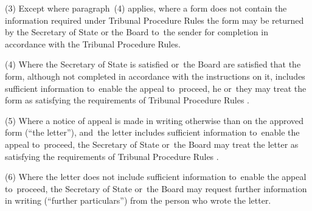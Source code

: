 \documentclass[12pt,a4paper]{article}
\begin{document}
%

(3) Except where paragraph~(4) applies, where a form does not contain the information required under Tribunal Procedure Rules the form may be returned by the Secretary of State
or the Board to~the sender for completion in accordance with the Tribunal Procedure Rules.

(4) Where the Secretary of State is satisfied 
or~the Board are satisfied   %
that the form, although not completed in accordance with the instructions on it, includes sufficient information to~enable the appeal 
to~proceed, he 
or~they   %
may treat the form as satisfying the requirements of 
Tribunal Procedure Rules%
.

(5) Where 
a notice of appeal  %
is made in writing otherwise than on the approved form (“the letter”), and~the letter includes sufficient information to~enable the appeal 
to~proceed, the Secretary of State 
or~the Board   %
may treat the letter as satisfying the requirements of 
Tribunal Procedure Rules%
.

(6) Where the letter does not include sufficient information to~enable the appeal %
to~proceed, the Secretary of State 
or~the Board   %
may request further information in writing (“further particulars”) from the person who wrote the letter.
\end{document}
